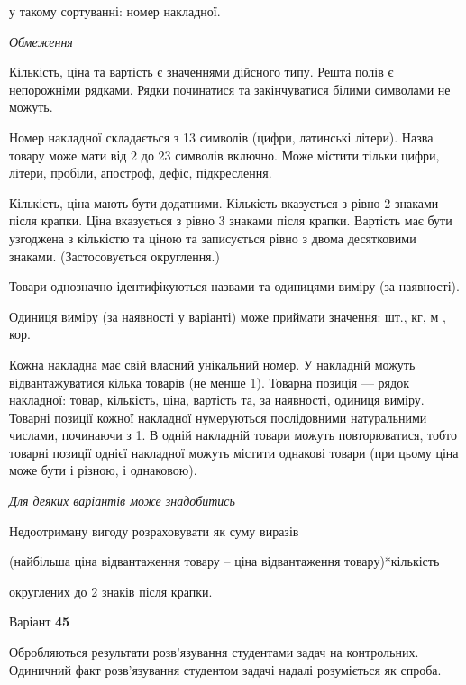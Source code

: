 \documentclass[11pt, ukrainian]{article}
\begin{document}
{\noindent}у такому сортуванні: номер накладної.


\bigskip\textit{Обмеження}

Кількість, ціна та вартість є значеннями дійсного типу.
Решта полів є непорожніми рядками.
Рядки починатися та закінчуватися білими символами не можуть.

Номер накладної складається з 13 символів (цифри, латинські літери).
Назва товару може мати від 2 до 23 символів включно.
Може містити тільки цифри, літери, пробіли, апостроф, дефіс, підкреслення.

Кількість, ціна мають бути додатними.
Кількість вказується з рівно 2 знаками після крапки.
Ціна вказується з рівно 3 знаками після крапки.
Вартість має бути узгоджена з кількістю та ціною та записується рівно з двома десятковими знаками.
(Застосовується округлення.)

Товари однозначно ідентифікуються назвами та одиницями виміру (за наявності).

Одиниця виміру (за наявності у варіанті) може приймати значення: шт., кг, м , кор.

Кожна накладна має свій власний унікальний номер.
У накладній можуть відвантажуватися кілька товарів (не менше 1).
Товарна позиція --- рядок накладної: товар, кількість, ціна, вартість та, за наявності, одиниця виміру.
Товарні позиції кожної накладної нумеруються послідовними натуральними числами, починаючи з 1.
В одній накладній товари можуть повторюватися, 
тобто товарні позиції однієї накладної можуть містити однакові товари 
(при цьому ціна може бути і різною, і однаковою).

\bigskip\textit{Для деяких варіантів може знадобитись}

Недоотриману вигоду розраховувати як суму виразів
{\center (найбільша ціна відвантаження товару – ціна відвантаження товару)*кількість\par}

\bigskip
{\noindent} округлених до 2 знаків після крапки.




\par
\newpage
{\center Варіант  \No \textbf { 45 }\par}
\bigskip
Обробляються результати розв’язування студентами задач на контрольних.
Одиничний факт роз\-в’я\-зу\-вання студентом задачі надалі розуміється як спроба.
\end{document}
